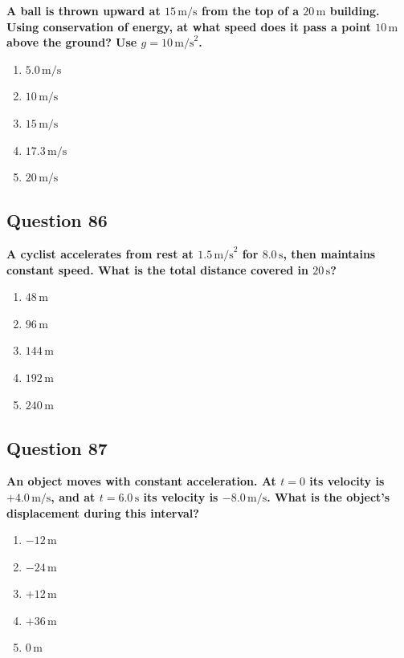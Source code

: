 \documentclass[12pt,letterpaper]{article}
\begin{document}
\begin{questionbox}
\textbf{A ball is thrown upward at $15\,\text{m/s}$ from the top of a $20\,\text{m}$ building. Using conservation of energy, at what speed does it pass a point $10\,\text{m}$ above the ground? Use $g = 10\,\text{m/s}^2$.}

\begin{enumerate}[label=\alph*)]
    \item $5.0\,\text{m/s}$
    \item $10\,\text{m/s}$
    \item $15\,\text{m/s}$
    \item $17.3\,\text{m/s}$
    \item $20\,\text{m/s}$
\end{enumerate}
\end{questionbox}

\subsection{Question 86}

\begin{questionbox}
\textbf{A cyclist accelerates from rest at $1.5\,\text{m/s}^2$ for $8.0\,\text{s}$, then maintains constant speed. What is the total distance covered in $20\,\text{s}$?}

\begin{enumerate}[label=\alph*)]
    \item $48\,\text{m}$
    \item $96\,\text{m}$
    \item $144\,\text{m}$
    \item $192\,\text{m}$
    \item $240\,\text{m}$
\end{enumerate}
\end{questionbox}

\subsection{Question 87}

\begin{questionbox}
\textbf{An object moves with constant acceleration. At $t = 0$ its velocity is $+4.0\,\text{m/s}$, and at $t = 6.0\,\text{s}$ its velocity is $-8.0\,\text{m/s}$. What is the object's displacement during this interval?}

\begin{enumerate}[label=\alph*)]
    \item $-12\,\text{m}$
    \item $-24\,\text{m}$
    \item $+12\,\text{m}$
    \item $+36\,\text{m}$
    \item $0\,\text{m}$
\end{enumerate}
\end{questionbox}
\end{document}
